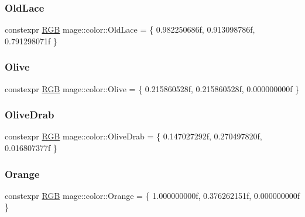 \mbox{\label{namespacemage_1_1color_a7c9fc63a81fb81315a77b6a031a5309f}} 
\subsubsection{\texorpdfstring{Old\+Lace}{OldLace}}
{\footnotesize\ttfamily constexpr \mbox{\hyperlink{structmage_1_1_r_g_b}{R\+GB}} mage\+::color\+::\+Old\+Lace = \{ 0.\+982250686f, 0.\+913098786f, 0.\+791298071f \}}

\mbox{\label{namespacemage_1_1color_a7e1414ce4e2b7db430d55135da40fe57}} 
\subsubsection{\texorpdfstring{Olive}{Olive}}
{\footnotesize\ttfamily constexpr \mbox{\hyperlink{structmage_1_1_r_g_b}{R\+GB}} mage\+::color\+::\+Olive = \{ 0.\+215860528f, 0.\+215860528f, 0.\+000000000f \}}

\mbox{\label{namespacemage_1_1color_af64e33355edbb29b2b6200bc3a4dbe17}} 
\subsubsection{\texorpdfstring{Olive\+Drab}{OliveDrab}}
{\footnotesize\ttfamily constexpr \mbox{\hyperlink{structmage_1_1_r_g_b}{R\+GB}} mage\+::color\+::\+Olive\+Drab = \{ 0.\+147027292f, 0.\+270497820f, 0.\+016807377f \}}

\mbox{\label{namespacemage_1_1color_ac29b4832f097eea80e4a07c4b4075ce6}} 
\subsubsection{\texorpdfstring{Orange}{Orange}}
{\footnotesize\ttfamily constexpr \mbox{\hyperlink{structmage_1_1_r_g_b}{R\+GB}} mage\+::color\+::\+Orange = \{ 1.\+000000000f, 0.\+376262151f, 0.\+000000000f \}}

